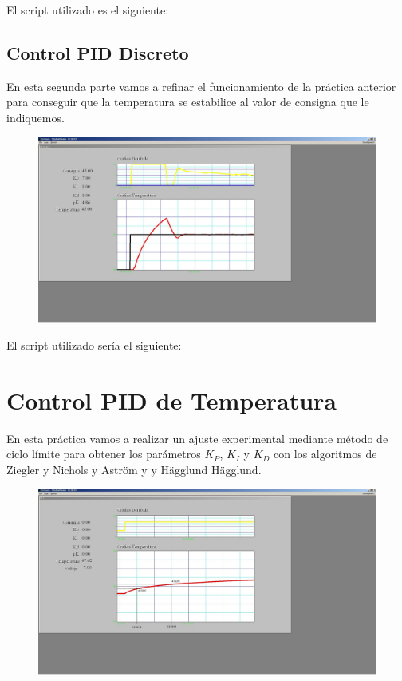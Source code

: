 \documentclass[10pt,a4paper,spanish]{report}
\begin{document}
\noindent
El script utilizado es el siguiente:

\newpage
\section{Control PID Discreto}

\noindent
En esta segunda parte vamos a refinar el funcionamiento de la práctica anterior para conseguir que la temperatura se estabilice al valor de consigna que le indiquemos.

\begin{figure}[!hbp]
	\centering  \includegraphics[width=1\textwidth]{Imagenes/p3-2.JPG}
\end{figure}

\noindent
El script utilizado sería el siguiente:


\chapter{Control PID de Temperatura}

\noindent
En esta práctica vamos a realizar un ajuste experimental mediante método de ciclo límite para obtener los parámetros $K_P$, $K_I$ y $K_D$ con los algoritmos de Ziegler y Nichols y Aström y y Hägglund Hägglund. \\

\begin{figure}[!hbp]
	\centering  \includegraphics[width=1\textwidth]{Imagenes/p4.JPG}
\end{figure}
\end{document}
